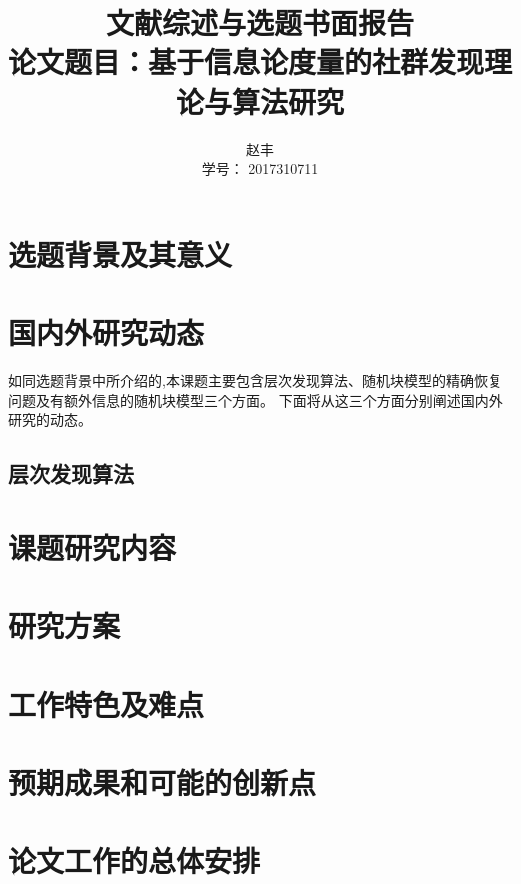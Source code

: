 \documentclass{ctexart}
\title{文献综述与选题书面报告 \\ \normalsize{论文题目：基于信息论度量的社群发现理论与算法研究 }
}
\author{赵丰 \\ 学号： 2017310711}
\begin{document}
\maketitle
\section{选题背景及其意义}
\section{国内外研究动态}
如同选题背景中所介绍的,本课题主要包含层次发现算法、随机块模型的精确恢复问题及有额外信息的随机块模型三个方面。
下面将从这三个方面分别阐述国内外研究的动态。
\subsection{层次发现算法}
\section{课题研究内容}
\section{研究方案}
\section{工作特色及难点}
\section{预期成果和可能的创新点}
\section{论文工作的总体安排}
\end{document}
